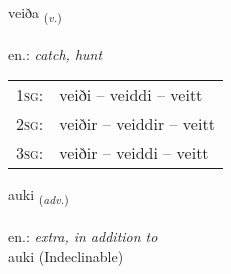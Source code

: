 \documentclass[frontgrid, backgrid]{flacards}\usepackage[]{graphicx}\usepackage[]{xcolor}
\begin{document}
\renewcommand{\flhead}{\vskip5pt \fboxsep=0pt {\small\bfseries\footnotesize Sagnorð | Verb}}
\renewcommand{\fcfoot}{\vskip5pt \fboxsep=0pt \hspace{2pt}{\small\bfseries\footnotesize 2K}}

\renewcommand{\blhead}{\vskip5pt {\small\bfseries\footnotesize Sagnorð | Verb }}
\renewcommand{\bcfoot}{\vskip5pt \hspace{2pt}{\small\bfseries\footnotesize 2K}}


{veiða \small{\textsubscript{(\textit{v.})}} \\[1ex] %
\textphonetic{[veiːða]} \\
en.: \emph{catch, hunt} \\  [2ex]
\renewcommand*{\arraystretch}{0.8}
\begin{tabular}{p{1cm}l}
\textsc{1sg}: & veiði -- veiddi -- veitt \\ 
\textsc{2sg}: & veiðir -- veiddir -- veitt \\ 
\textsc{3sg}: & veiðir -- veiddi -- veitt \\ 
\end{tabular}
}


\renewcommand{\flhead}{\vskip5pt \fboxsep=0pt {\small\bfseries\footnotesize Atviksorð | Adverb}}
\renewcommand{\fcfoot}{\vskip5pt \fboxsep=0pt \hspace{2pt}{\small\bfseries\footnotesize 2K}}

\renewcommand{\blhead}{\vskip5pt {\small\bfseries\footnotesize Atviksorð | Adverb }}
\renewcommand{\bcfoot}{\vskip5pt \hspace{2pt}{\small\bfseries\footnotesize 2K}}


{auki \small{\textsubscript{(\textit{adv.})}} \\[1ex]
\textphonetic{[œiːcɪ]} \\
en.: \emph{extra, in addition to} \\  [2ex]
auki (Indeclinable)}

\renewcommand{\flhead}{\vskip5pt \fboxsep=0pt {\small\bfseries\footnotesize Lýsingarorð | Adjective}}
\renewcommand{\fcfoot}{\vskip5pt \fboxsep=0pt \hspace{2pt}{\small\bfseries\footnotesize 2K}}
\end{document}
